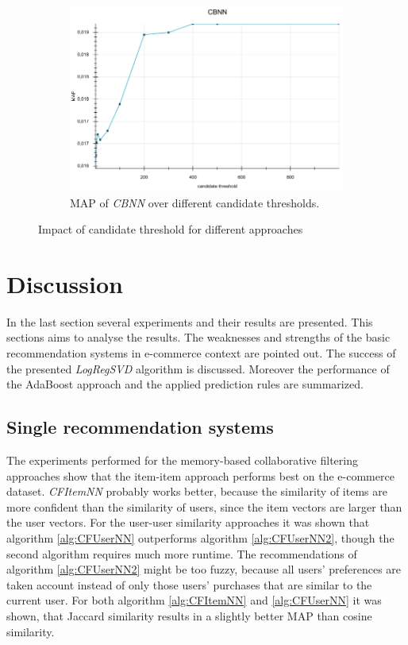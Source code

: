 \documentclass[10pt]{reportMaster}
\begin{document}
\begin{figure}
\begin{subfigure}[c]{0.5\textwidth}
		\includegraphics[width=1\textwidth]{figures/experiments/CBNNCandidates}
		\caption{MAP of \textit{CBNN} over different candidate thresholds.}
		\label{fig:CBNNCandidates}
	\end{subfigure}
	\caption{Impact of candidate threshold for different approaches}
	\label{fig:candidates}
\end{figure}


\section{Discussion}
\label{sec:discussion}
In the last section several experiments and their results are presented.
This sections aims to analyse the results.
The weaknesses and strengths of the basic recommendation systems in e-commerce context are pointed out.
The success of the presented \textit{LogRegSVD} algorithm is discussed.
Moreover the performance of the AdaBoost approach and the applied prediction rules are summarized.

\subsection{Single recommendation systems}
\label{sec:discSingleRecommendationSystems}
The experiments performed for the memory-based collaborative filtering approaches show that the item-item approach performs best on the e-commerce dataset.
\textit{CFItemNN} probably works better, because the similarity of items are more confident than the similarity of users, since the item vectors are larger than the user vectors.
For the user-user similarity approaches it was shown that algorithm \ref{alg:CFUserNN} outperforms algorithm \ref{alg:CFUserNN2}, though the second algorithm requires much more runtime.
The recommendations of algorithm \ref{alg:CFUserNN2} might be too fuzzy, because all users' preferences are taken account instead of only those users' purchases that are similar to the current user.
For both algorithm \ref{alg:CFItemNN} and \ref{alg:CFUserNN} it was shown, that Jaccard similarity results in a slightly better MAP than cosine similarity.
\end{document}
